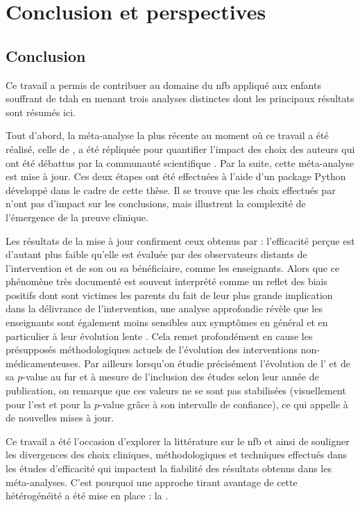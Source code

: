 \chapter{Conclusion et perspectives} \label{chapitre-5}

\section{Conclusion}

Ce travail a permis de contribuer au domaine du \gls{nfb} appliqué aux enfants souffrant de \gls{tdah} en menant trois analyses 
distinctes dont les principaux résultats sont résumés ici. 

Tout d'abord, la méta-analyse la plus récente au moment où ce travail a été réalisé, celle de \citet{Cortese2016}, a été répliquée 
pour quantifier l'impact des choix des auteurs qui ont été débattus par la communauté scientifique \citep{Micoulaud2016}. Par la suite, cette méta-analyse est 
mise à jour. Ces deux étapes ont été effectuées à l'aide d'un package Python développé 
dans le cadre de cette thèse. Il se trouve que les choix effectués par \citet{Cortese2016} n'ont pas d'impact sur les conclusions, 
mais illustrent la complexité de l'émergence de la preuve clinique.

Les résultats de la mise à jour confirment ceux obtenus par \citet{Cortese2016} : 
l'efficacité perçue est d'autant plus faible qu'elle est évaluée par 
des observateurs distants de l'intervention et de son ou sa bénéficiaire, comme les enseignants. Alors que ce phénomène très documenté est souvent 
interprété comme un reflet des biais positifs dont sont victimes les parents du fait de leur plus grande implication dans la délivrance de 
l'intervention, une analyse approfondie révèle que les enseignants sont également moins sensibles aux symptômes en général et en particulier 
à leur évolution lente \citep{Sollie2013, Narad2015}. 
Cela remet profondément en cause les présupposés méthodologiques actuels de l'évolution des interventions non-médicamenteuses. Par ailleurs
lorsqu'on étudie précisément l'évolution de l' et de sa $p$-value au fur et à mesure de l'inclusion des études selon leur année de publication, 
on remarque que ces valeurs ne se sont pas stabilisées (visuellement pour l'\gls{est} et pour la $p$-value grâce à son intervalle de confiance), 
ce qui appelle à de nouvelles mises à jour.

Ce travail a été l'occasion d'explorer 
la littérature sur le \gls{nfb} et ainsi de souligner les divergences des choix cliniques, méthodologiques et techniques effectués dans les études 
d'efficacité qui impactent la fiabilité
des résultats obtenus dans les méta-analyses. C'est pourquoi une approche tirant avantage de cette hétérogénéité a été mise en place : la .

